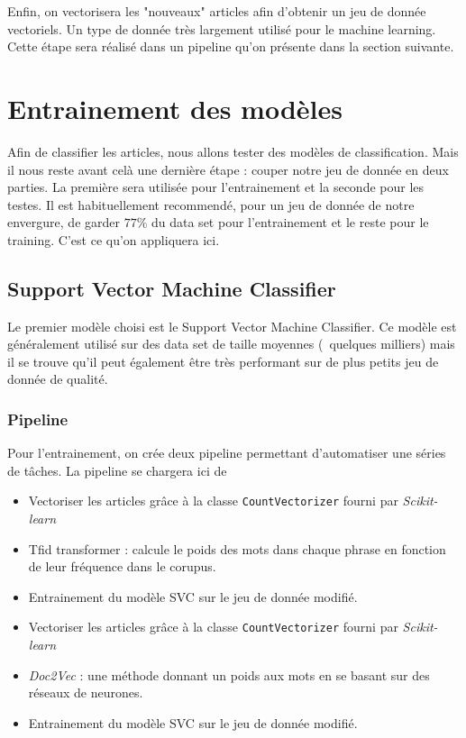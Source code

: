 \documentclass[a4paper,12pt]{article}
\begin{document}
Enfin, on vectorisera les "nouveaux" articles afin d'obtenir un jeu de donnée vectoriels. Un type de donnée très largement utilisé pour le machine learning. Cette étape sera réalisé dans un pipeline qu'on présente dans la section suivante.

\section{Entrainement des modèles}

Afin de classifier les articles, nous allons tester des modèles de classification. Mais il nous reste avant celà une dernière étape : couper notre jeu de donnée en deux parties. La première sera utilisée pour l'entrainement et la seconde pour les testes. Il est habituellement recommendé, pour un jeu de donnée de notre envergure, de garder $77\%$ du data set pour l'entrainement et le reste pour le training. C'est ce qu'on appliquera ici.\\

\subsection{Support Vector Machine Classifier}

Le premier modèle choisi est le Support Vector Machine Classifier. Ce modèle est généralement utilisé sur des data set de taille moyennes (~quelques milliers) mais il se trouve qu'il peut également être très performant sur de plus petits jeu de donnée de qualité.\\

\subsubsection{Pipeline}

Pour l'entrainement, on crée deux pipeline permettant d'automatiser une séries de tâches. La pipeline se chargera ici de
\begin{itemize}
\item Vectoriser les articles grâce à la classe \texttt{CountVectorizer} fourni par \textit{Scikit-learn}
\item Tfid transformer : calcule le poids des mots dans chaque phrase en fonction de leur fréquence dans le corupus.
\item Entrainement du modèle SVC sur le jeu de donnée modifié.
\end{itemize}

\begin{itemize}
\item Vectoriser les articles grâce à la classe \texttt{CountVectorizer} fourni par \textit{Scikit-learn}
\item \textit{Doc2Vec} : une méthode donnant un poids aux mots en se basant sur des réseaux  de neurones.
\item Entrainement du modèle SVC sur le jeu de donnée modifié.
\end{itemize}
\end{document}
